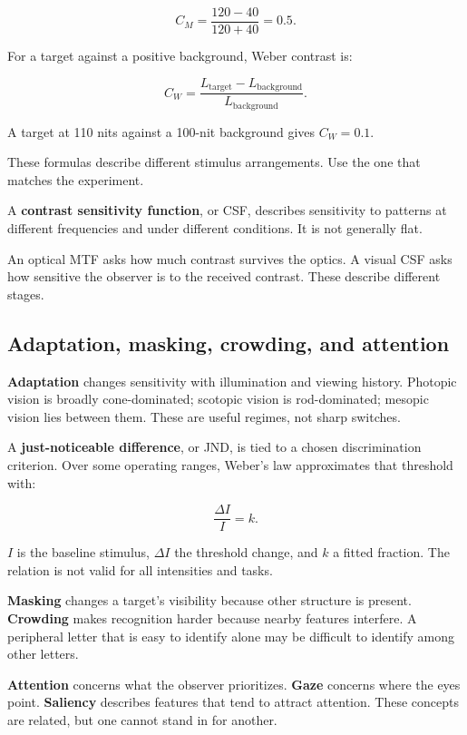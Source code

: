 \[
C_M=\frac{120-40}{120+40}=0.5.
\]

For a target against a positive background, Weber contrast is:

\[
C_W=\frac{L_{\mathrm{target}}-L_{\mathrm{background}}}
{L_{\mathrm{background}}}.
\]

A target at 110 nits against a 100-nit background gives \(C_W=0.1\).

These formulas describe different stimulus arrangements. Use the one that matches the experiment.

A \textbf{contrast sensitivity function}, or CSF, describes sensitivity to patterns at different frequencies and under different conditions. It is not generally flat.

An optical MTF asks how much contrast survives the optics. A visual CSF asks how sensitive the observer is to the received contrast. These describe different stages.

\subsection{Adaptation, masking, crowding, and attention}\label{04-visual-computing-ii-ch043-adaptation-masking-crowding-and-attention}

\textbf{Adaptation} changes sensitivity with illumination and viewing history. Photopic vision is broadly cone-dominated; scotopic vision is rod-dominated; mesopic vision lies between them. These are useful regimes, not sharp switches.

A \textbf{just-noticeable difference}, or JND, is tied to a chosen discrimination criterion. Over some operating ranges, Weber's law approximates that threshold with:

\[
\frac{\Delta I}{I}=k.
\]

\(I\) is the baseline stimulus, \(\Delta I\) the threshold change, and \(k\) a fitted fraction. The relation is not valid for all intensities and tasks.

\textbf{Masking} changes a target's visibility because other structure is present. \textbf{Crowding} makes recognition harder because nearby features interfere. A peripheral letter that is easy to identify alone may be difficult to identify among other letters.

\textbf{Attention} concerns what the observer prioritizes. \textbf{Gaze} concerns where the eyes point. \textbf{Saliency} describes features that tend to attract attention. These concepts are related, but one cannot stand in for another.

